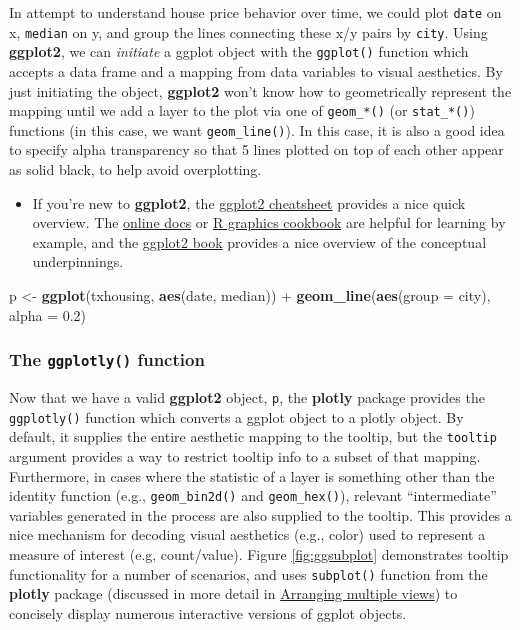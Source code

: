 \documentclass[12pt,]{isuthesis}
\newenvironment{Shaded}{\begin{snugshade}}{\end{snugshade}}
\newcommand{\KeywordTok}[1]{\textcolor[rgb]{0.13,0.29,0.53}{\textbf{{#1}}}}
\newcommand{\DataTypeTok}[1]{\textcolor[rgb]{0.13,0.29,0.53}{{#1}}}
\newcommand{\FloatTok}[1]{\textcolor[rgb]{0.00,0.00,0.81}{{#1}}}
\newcommand{\StringTok}[1]{\textcolor[rgb]{0.31,0.60,0.02}{{#1}}}
\newcommand{\NormalTok}[1]{{#1}}
\newenvironment{rmdblock}[1]
  {\begin{shaded*}
  \begin{itemize}
  \renewcommand{\labelitemi}{
    \raisebox{-.7\height}[0pt][0pt]{
      {\setkeys{Gin}{width=3em,keepaspectratio}\texttt{[image: images/\#1]}}
    }
  }
  \item
  }
  {
  \end{itemize}
  \end{shaded*}
  }
\newenvironment{rmdtip}
  {\begin{rmdblock}{tip}}
  {\end{rmdblock}}
\begin{document}
In attempt to understand house price behavior over time, we could plot
\texttt{date} on x, \texttt{median} on y, and group the lines connecting
these x/y pairs by \texttt{city}. Using \textbf{ggplot2}, we can
\emph{initiate} a ggplot object with the \texttt{ggplot()} function
which accepts a data frame and a mapping from data variables to visual
aesthetics. By just initiating the object, \textbf{ggplot2} won't know
how to geometrically represent the mapping until we add a layer to the
plot via one of \texttt{geom\_*()} (or \texttt{stat\_*()}) functions (in
this case, we want \texttt{geom\_line()}). In this case, it is also a
good idea to specify alpha transparency so that 5 lines plotted on top
of each other appear as solid black, to help avoid overplotting.

\begin{rmdtip}
If you're new to \textbf{ggplot2}, the
\href{https://www.rstudio.com/wp-content/uploads/2015/12/ggplot2-cheatsheet-2.0.pdf}{ggplot2
cheatsheet} provides a nice quick overview. The
\href{http://docs.ggplot2.org/current/}{online docs} or
\href{http://www.cookbook-r.com/Graphs/}{R graphics cookbook} are
helpful for learning by example, and the
\href{https://github.com/hadley/ggplot2-book}{ggplot2 book} provides a
nice overview of the conceptual underpinnings.
\end{rmdtip}

\begin{Shaded}
\begin{Highlighting}[]
\NormalTok{p <-}\StringTok{ }\KeywordTok{ggplot}\NormalTok{(txhousing, }\KeywordTok{aes}\NormalTok{(date, median)) +}
\StringTok{  }\KeywordTok{geom_line}\NormalTok{(}\KeywordTok{aes}\NormalTok{(}\DataTypeTok{group =} \NormalTok{city), }\DataTypeTok{alpha =} \FloatTok{0.2}\NormalTok{)}
\end{Highlighting}
\end{Shaded}

\subsubsection{\texorpdfstring{The \texttt{ggplotly()}
function}{The ggplotly() function}}\label{ggplotly}

Now that we have a valid \textbf{ggplot2} object, \texttt{p}, the
\textbf{plotly} package provides the \texttt{ggplotly()} function which
converts a ggplot object to a plotly object. By default, it supplies the
entire aesthetic mapping to the tooltip, but the \texttt{tooltip}
argument provides a way to restrict tooltip info to a subset of that
mapping. Furthermore, in cases where the statistic of a layer is
something other than the identity function (e.g., \texttt{geom\_bin2d()}
and \texttt{geom\_hex()}), relevant ``intermediate'' variables generated
in the process are also supplied to the tooltip. This provides a nice
mechanism for decoding visual aesthetics (e.g., color) used to represent
a measure of interest (e.g, count/value). Figure \ref{fig:ggsubplot}
demonstrates tooltip functionality for a number of scenarios, and uses
\texttt{subplot()} function from the \textbf{plotly} package (discussed
in more detail in \protect\hyperlink{arranging-multiple-views}{Arranging
multiple views}) to concisely display numerous interactive versions of
ggplot objects.
\end{document}

